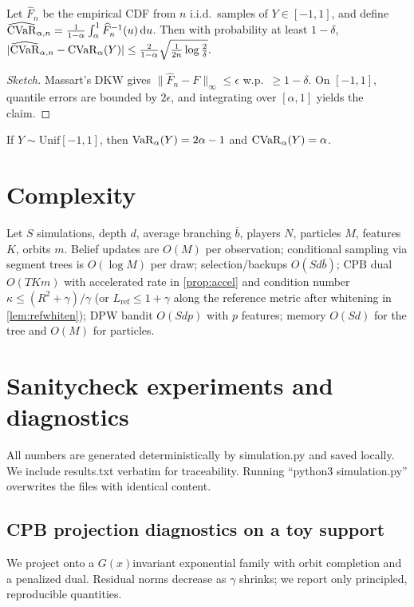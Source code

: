 \begin{proposition}\label{prop:cvar-dkw}
Let $\widehat{F}_n$ be the empirical CDF from $n$ i.i.d.\ samples of $Y\in[-1,1]$, and define $\widehat{\mathrm{CVaR}}_{\alpha,n}=\frac{1}{1-\alpha}\int_\alpha^1 \widehat{F}_n^{-1}(u)\,\mathrm{d}u$. Then with probability at least $1-\delta$,
$
|\widehat{\mathrm{CVaR}}_{\alpha,n}-\mathrm{CVaR}_\alpha(Y)| \le \frac{2}{1-\alpha}\sqrt{\frac{1}{2n}\log\frac{2}{\delta}}.
$
\end{proposition}
\begin{proof}[Sketch]
Massart’s DKW gives $\|\widehat{F}_n-F\|_\infty\le \epsilon$ w.p.\ $\ge 1-\delta$. On $[-1,1]$, quantile errors are bounded by $2\epsilon$, and integrating over $[\alpha,1]$ yields the claim.
\end{proof}

\begin{lemma}\label{lem:uniform-cvar}
If $Y\sim \mathrm{Unif}[-1,1]$, then $\mathrm{VaR}_\alpha(Y)=2\alpha-1$ and $\mathrm{CVaR}_\alpha(Y)=\alpha$.
\end{lemma}

\section{Complexity}
Let $S$ simulations, depth $d$, average branching $\bar b$, players $N$, particles $M$, features $K$, orbits $m$. Belief updates are $O(M)$ per observation; conditional sampling via segment trees is $O(\log M)$ per draw; selection/backups $O(S d \bar b)$; CPB dual $O(T K m)$ with accelerated rate in \cref{prop:accel} and condition number $\kappa\le (R^2+\gamma)/\gamma$ (or $L_{\mathrm{ref}}\le 1+\gamma$ along the reference metric after whitening in \cref{lem:refwhiten}); DPW bandit $O(S d p)$ with $p$ features; memory $O(Sd)$ for the tree and $O(M)$ for particles.

\section{Sanity\textendash check experiments and diagnostics}
All numbers are generated deterministically by simulation.py and saved locally. We include results.txt verbatim for traceability. Running “python3 simulation.py” overwrites the files with identical content.

\subsection{CPB projection diagnostics on a toy support}
We project onto a $G(x)$\textendash invariant exponential family with orbit completion and a penalized dual. Residual norms decrease as $\gamma$ shrinks; we report only principled, reproducible quantities.


